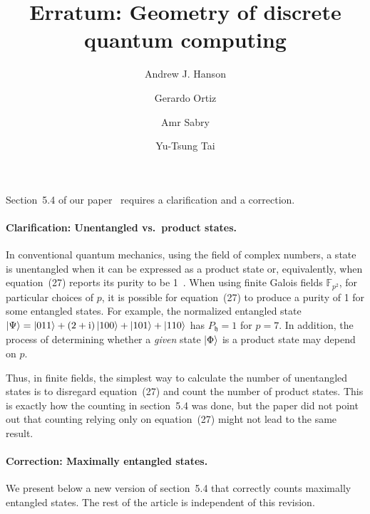 \documentclass{iopart}
\newcommand{\ff}[1]{\mathbb{F}_{#1}}
\def\fh{\mathfrak{h}}
\begin{document}
\title{Erratum: Geometry of discrete quantum computing}

\author{Andrew J. Hanson}
\address{School of Informatics and Computing, Indiana University, Bloomington, IN 47405, U.S.A}

\author{Gerardo Ortiz}
\address{Department of Physics, Indiana University, Bloomington, IN 47405, U.S.A}

\author{Amr Sabry}
\address{School of Informatics and Computing, Indiana University, Bloomington, IN 47405, U.S.A}

\author{Yu-Tsung Tai}
\address{Department of Mathematics, Indiana University, Bloomington, IN 47405, U.S.A}
\address{School of Informatics and Computing, Indiana University, Bloomington, IN 47405, U.S.A}


\maketitle

\noindent Section~5.4 of our paper~\cite{geometry} requires a clarification and a correction.

\paragraph*{Clarification: Unentangled vs.\ product states.}
In conventional quantum mechanics, using the field of complex numbers, a state is unentangled when it can be expressed as a product state or, equivalently, when equation~(27) reports its purity to be 1~\cite{PhysRevLett.92.107902, PhysRevA.68.032308}. When using finite Galois fields $\ff{p^2}$, for particular choices of $p$, it is possible for equation~(27) to produce a purity of 1 for some entangled states. For example, the normalized entangled state $\ket{\Psi} = \ket{011}+\left(2+\mathrm{i}\right)\ket{100}+\ket{101}+\ket{110}$ has $P_{\fh}=1$ for $p=7$. In addition, the process of determining whether a \emph{given} state $\ket{\Phi}$ is a product state may depend on $p$. 

Thus, in finite fields, the simplest way to calculate the number of
unentangled states is to disregard equation~(27) and count the number
of product states. This is exactly how the counting in section~5.4
was done, but the paper did not point out that counting relying only on equation~(27) might not lead to the same result.

\paragraph*{Correction: Maximally entangled states.}
We present below a new version of section~5.4 that correctly counts maximally entangled states. The rest of the article is independent of this revision.
\end{document}
